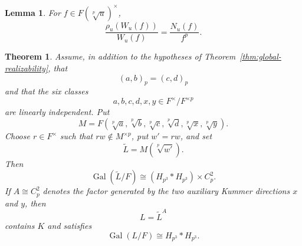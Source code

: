 \documentclass[10pt,a4paper]{amsart}
\newtheorem{theorem}{Theorem}
\newtheorem{lemma}{Lemma}
\DeclareMathOperator{\Gal}{Gal}
\newcommand{\Hp}{H_{p^3}}
\begin{document}
\begin{lemma}\label{lem:W-ratio}
For $f\in F(\sqrt[p]{u})^\times$,
\[
 \frac{\rho_u(W_u(f))}{W_u(f)}=\frac{N_u(f)}{f^p}.
\]
\end{lemma}

\begin{theorem}\label{thm:explicit}
Assume, in addition to the hypotheses of
Theorem~\ref{thm:global-realizability}, that
\[
 (a,b)_p=(c,d)_p
\]
and that the six classes
\[
 a,b,c,d,x,y\in F^\times/F^{\times p}
\]
are linearly independent. Put
\[
 M=F(\sqrt[p]{a},\sqrt[p]{b},\sqrt[p]{c},\sqrt[p]{d},
   \sqrt[p]{x},\sqrt[p]{y}).
\]
Choose $r\in F^\times$ such that $rw\notin M^{\times p}$, put $w'=rw$,
and set
\[
 \widetilde L=M(\sqrt[p]{w'}).
\]
Then
\[
 \Gal(\widetilde L/F)\cong(\Hp*\Hp)\times C_p^2.
\]
If $A\cong C_p^2$ denotes the factor generated by the two auxiliary Kummer
directions $x$ and $y$, then
\[
 L=\widetilde L^A
\]
contains $K$ and satisfies
\[
 \Gal(L/F)\cong\Hp*\Hp.
\]
\end{theorem}
\end{document}
